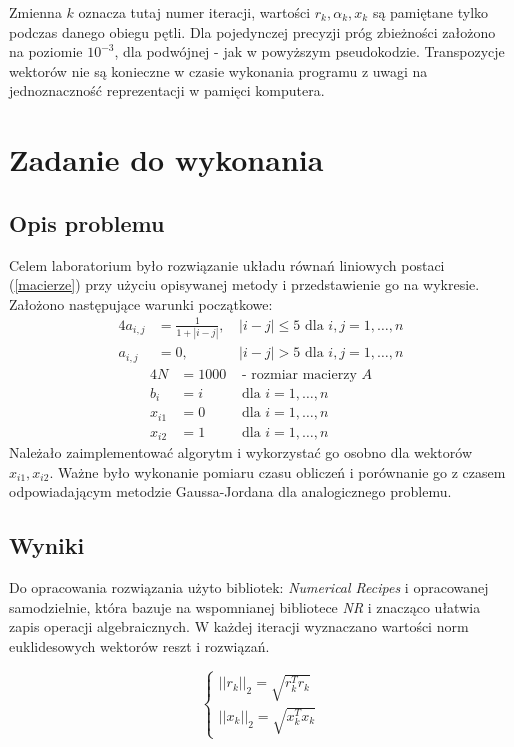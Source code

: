Zmienna $k$ oznacza tutaj numer iteracji, wartości $ r_k, \alpha_k, x_k $ są pamiętane tylko podczas danego obiegu pętli. Dla pojedynczej precyzji próg zbieżności założono na poziomie $ 10^{-3} $, dla podwójnej - jak w powyższym pseudokodzie. Transpozycje wektorów nie są konieczne w czasie wykonania programu z uwagi na jednoznaczność reprezentacji w pamięci komputera.

\section{Zadanie do wykonania}

\subsection{Opis problemu}

Celem laboratorium było rozwiązanie układu równań liniowych postaci (\ref{macierze}) przy użyciu opisywanej metody i przedstawienie go na wykresie. Założono następujące warunki początkowe:
\begin{alignat*}{4}
a_{i,j} &= \frac{1}{1 + |i - j|}\text{, } &|i - j| \leq 5 \text{ dla }i,j = 1, \dots , n \\
a_{i,j} &= 0\text{, }  &|i - j| > 5 \text{ dla }i,j = 1, \dots , n 
\end{alignat*}
\begin{alignat*}{4}
N &= 1000 &\text{ - rozmiar macierzy } A \\
b_i &= i &\text{ dla }i = 1, \dots , n \\
x_{i1} &= 0 &\text{ dla }i = 1, \dots , n \\
x_{i2} &= 1 &\text{ dla }i = 1, \dots , n 
\end{alignat*}
Należało zaimplementować algorytm i wykorzystać go osobno dla wektorów $ x_{i1}, x_{i2} $. Ważne było wykonanie pomiaru czasu obliczeń i porównanie go z czasem odpowiadającym metodzie Gaussa-Jordana dla analogicznego problemu.
\subsection{Wyniki}
Do opracowania rozwiązania użyto bibliotek: \textit{Numerical Recipes} i opracowanej samodzielnie, która bazuje na wspomnianej bibliotece \textit{NR} i znacząco ułatwia zapis operacji algebraicznych. W każdej iteracji wyznaczano wartości norm euklidesowych wektorów reszt i rozwiązań.

\begin{equation}
\begin{cases}
||r_k||_2 = \sqrt{r_{k}^{T}r_k} \\
||x_k||_2 = \sqrt{x_{k}^{T}x_k}
\end{cases}
\end{equation}

